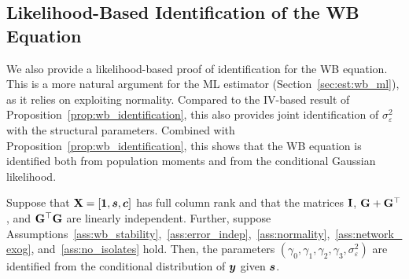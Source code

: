 \subsection{Likelihood-Based Identification of the WB Equation}
\label{sec:model:wb_ml_identification}
We also provide a likelihood-based proof of identification for the WB equation. This is a more natural argument for the ML estimator (Section~\ref{sec:est:wb_ml}), as it relies on exploiting normality. Compared to the IV-based result of Proposition~\ref{prop:wb_identification}, this also provides joint identification of $\sigma_\varepsilon^2$ with the structural parameters. Combined with Proposition~\ref{prop:wb_identification}, this shows that the WB equation is identified both from population moments and from the conditional Gaussian likelihood.

\begin{proposition}
\label{prop:wb_ml_identification}
Suppose that $\mathbf{X} = [\bm{1}, \bm{s}, \bm{c}]$ has full column rank and that the matrices $\mathbf{I}$, $\mathbf{G} + \mathbf{G}^\top$, and $\mathbf{G}^\top\mathbf{G}$ are linearly independent. Further, suppose Assumptions~\ref{ass:wb_stability},~\ref{ass:error_indep},~\ref{ass:normality},~\ref{ass:network_exog}, and~\ref{ass:no_isolates} hold. Then, the parameters $(\gamma_0, \gamma_1, \gamma_2, \gamma_3, \sigma_\varepsilon^2)$ are identified from the conditional distribution of $\bm{y}$ given $\bm{s}$.
\end{proposition}

